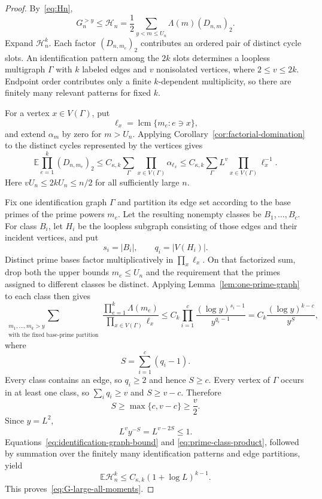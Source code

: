 \documentclass[11pt]{article}
\theoremstyle{remark}
\newcommand{\Ee}{\mathbb E}
\newcommand{\lcm}{\operatorname{lcm}}
\begin{document}
\begin{proof}
By~\eqref{eq:Hn},
\[
 G_n^{>y}\le\mathcal H_n
 =\frac12\sum_{y<m\le U_n}\Lambda(m)(D_{n,m})_2.
\]
Expand $\mathcal H_n^k$.  Each factor $(D_{n,m_e})_2$ contributes an
ordered pair of distinct cycle slots.  An identification pattern among the $2k$ slots determines a loopless
multigraph $\Gamma$ with $k$ labeled edges and $v$ nonisolated vertices,
where $2\le v\le2k$.  Endpoint order contributes only a finite
$k$-dependent multiplicity, so there are finitely many relevant patterns for
fixed $k$.

For a vertex $x\in V(\Gamma)$, put
\[
 \ell_x=\lcm\{m_e:e\ni x\},
\]
and extend $\alpha_m$ by zero for $m>U_n$.  Applying
Corollary~\ref{cor:factorial-domination} to the distinct cycles represented
by the vertices gives
\begin{equation}
\label{eq:identification-graph-bound}
 \Ee\prod_{e=1}^k(D_{n,m_e})_2
 \le C_{\kappa,k}
 \sum_{\Gamma}\prod_{x\in V(\Gamma)}\alpha_{\ell_x}
 \le C_{\kappa,k}
 \sum_{\Gamma}L^v\prod_{x\in V(\Gamma)}\ell_x^{-1}.
\end{equation}
Here $vU_n\le2kU_n\le n/2$ for all sufficiently large $n$.

Fix one identification graph $\Gamma$ and partition its edge set according
to the base primes of the prime powers $m_e$.  Let the resulting nonempty
classes be $B_1,\ldots,B_c$.  For class $B_i$, let $H_i$ be the loopless
subgraph consisting of those edges and their incident vertices, and put
\[
 s_i=|B_i|,
 \qquad
 q_i=|V(H_i)|.
\]
Distinct prime bases factor multiplicatively in $\prod_x\ell_x$.  On that
factorized sum, drop both the upper bounds $m_e\le U_n$ and the requirement
that the primes assigned to different classes be distinct.  Applying
Lemma~\ref{lem:one-prime-graph} to each class then gives
\begin{equation}
\label{eq:prime-class-product}
 \sum_{\substack{m_1,\ldots,m_k>y\\
                   \text{with the fixed base-prime partition}}}
 \frac{\prod_{e=1}^k\Lambda(m_e)}
      {\prod_{x\in V(\Gamma)}\ell_x}
 \le C_k\prod_{i=1}^c
 \frac{(\log y)^{s_i-1}}{y^{q_i-1}}
 =C_k\frac{(\log y)^{k-c}}{y^S},
\end{equation}
where
\[
 S=\sum_{i=1}^c(q_i-1).
\]
Every class contains an edge, so $q_i\ge2$ and hence $S\ge c$.  Every
vertex of $\Gamma$ occurs in at least one class, so
$\sum_iq_i\ge v$ and $S\ge v-c$.  Therefore
\[
 S\ge\max\{c,v-c\}\ge\frac v2.
\]
Since $y=L^2$,
\[
 L^vy^{-S}=L^{v-2S}\le1.
\]
Equations~\eqref{eq:identification-graph-bound} and
\eqref{eq:prime-class-product}, followed by summation over the finitely many
identification patterns and edge partitions, yield
\[
 \Ee\mathcal H_n^k
 \le C_{\kappa,k}(1+\log L)^{k-1}.
\]
This proves~\eqref{eq:G-large-all-moments}.
\end{proof}
\end{document}
